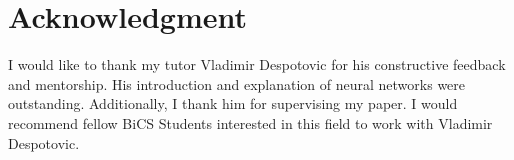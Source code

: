 
\section*{Acknowledgment}

I would like to thank my tutor Vladimir Despotovic for his constructive feedback
and mentorship. His introduction and explanation of neural networks were
outstanding. Additionally, I thank him for supervising my paper. I would
recommend fellow BiCS Students interested in this field to work with Vladimir
Despotovic. 

